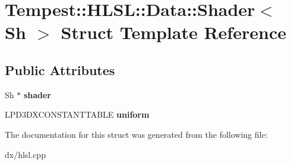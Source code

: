 \hypertarget{struct_h_l_s_l_1_1_data_1_1_shader}{\section{Tempest\+:\+:H\+L\+S\+L\+:\+:Data\+:\+:Shader$<$ Sh $>$ Struct Template Reference}
\label{struct_h_l_s_l_1_1_data_1_1_shader}
}
\subsection*{Public Attributes}
\begin{DoxyCompactItemize}
\item 
\hypertarget{struct_h_l_s_l_1_1_data_1_1_shader_a8f91e07d92922c2a545c927921ca633b}{Sh $\ast$ {\bfseries shader}}\label{struct_h_l_s_l_1_1_data_1_1_shader_a8f91e07d92922c2a545c927921ca633b}

\item 
\hypertarget{struct_h_l_s_l_1_1_data_1_1_shader_a2fb78c3b4f3c33e4b583dae599c56eab}{L\+P\+D3\+D\+X\+C\+O\+N\+S\+T\+A\+N\+T\+T\+A\+B\+L\+E {\bfseries uniform}}\label{struct_h_l_s_l_1_1_data_1_1_shader_a2fb78c3b4f3c33e4b583dae599c56eab}

\end{DoxyCompactItemize}


The documentation for this struct was generated from the following file\+:\begin{DoxyCompactItemize}
\item 
dx/hlsl.\+cpp\end{DoxyCompactItemize}

